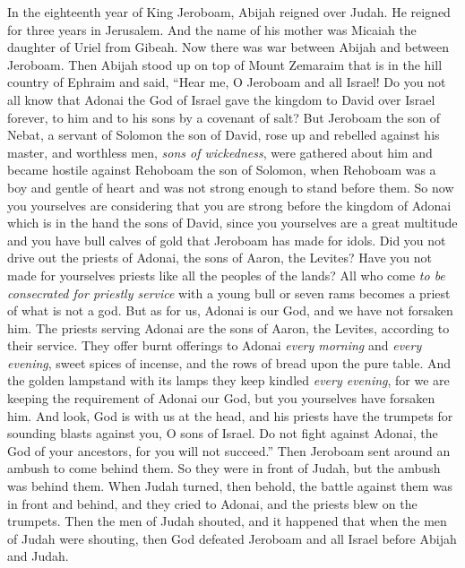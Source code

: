 \begin{biblechapter} %
 In the eighteenth year of King Jeroboam, Abijah reigned over Judah.
\verse He reigned for three years in Jerusalem. And the name of his mother was Micaiah the daughter of Uriel from Gibeah.
\verse Now there was war between Abijah and between Jeroboam.
\verse Then Abijah stood up on top of Mount Zemaraim that is in the hill country of Ephraim and said, “Hear me, O Jeroboam and all Israel!
\verse Do you not all know that Adonai the God of Israel gave the kingdom to David over Israel forever, to him and to his sons by a covenant of salt?
\verse But Jeroboam the son of Nebat, a servant of Solomon the son of David, rose up and rebelled against his master,
\verse and worthless men, \textit{sons of wickedness}, were gathered about him and became hostile against Rehoboam the son of Solomon, when Rehoboam was a boy and gentle of heart and was not strong enough to stand before them.
\verse So now you yourselves are considering that you are strong before the kingdom of Adonai which is in the hand the sons of David, since you yourselves are a great multitude and you have bull calves of gold that Jeroboam has made for idols.
\verse Did you not drive out the priests of Adonai, the sons of Aaron, the Levites? Have you not made for yourselves priests like all the peoples of the lands? All who come \textit{to be consecrated for priestly service} with a young bull or seven rams becomes a priest of what is not a god.
\verse But as for us, Adonai is our God, and we have not forsaken him. The priests serving Adonai are the sons of Aaron, the Levites, according to their service.
\verse They offer burnt offerings to Adonai \textit{every morning} and \textit{every evening}, sweet spices of incense, and the rows of bread upon the pure table. And the golden lampstand with its lamps they keep kindled \textit{every evening}, for we are keeping the requirement of Adonai our God, but you yourselves have forsaken him.
\verse And look, God is with us at the head, and his priests have the trumpets for sounding blasts against you, O sons of Israel. Do not fight against Adonai, the God of your ancestors, for you will not succeed.”
\verse Then Jeroboam sent around an ambush to come behind them. So they were in front of Judah, but the ambush was behind them.
\verse When Judah turned, then behold, the battle against them was in front and behind, and they cried to Adonai, and the priests blew on the trumpets.
\verse Then the men of Judah shouted, and it happened that when the men of Judah were shouting, then God defeated Jeroboam and all Israel before Abijah and Judah.

\end{biblechapter}
